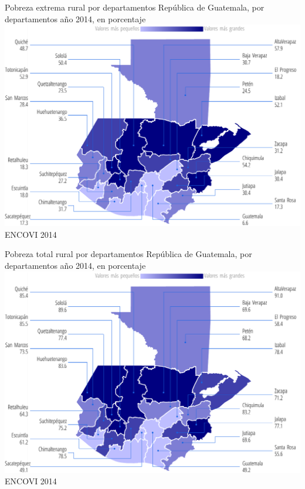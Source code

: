                     
                    {%
                    }%
                    {%
                    	Pobreza extrema rural por departamentos
                    } %
                    {%
                    	República de Guatemala, por departamentos año 2014, en porcentaje} %
                    {%
                    	\includegraphics[width=52\cuadri]{graficas/1_16.pdf}}%
                    {%
                    	ENCOVI 2014} %
                    
                    
                    {%
                    }%
                    {%
                    	Pobreza total rural por departamentos
                    } %
                    {%
                    	República de Guatemala, por departamentos año 2014, en porcentaje} %
                    {%
                    	\includegraphics[width=52\cuadri]{graficas/1_17.pdf}}%
                    {%
                    	ENCOVI 2014} %
                    
